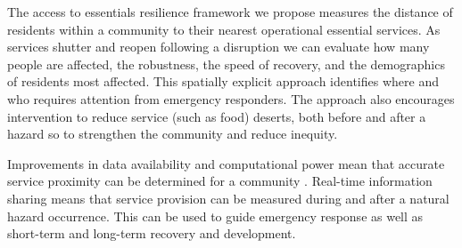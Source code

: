 \documentclass[9pt,twocolumn,twoside,lineno]{pnas-new}
\begin{document}
The access to essentials resilience framework we propose measures the distance of residents within a community to their nearest operational essential services. As services shutter and reopen following a disruption we can evaluate how many people are affected, the robustness, the speed of recovery, and the demographics of residents most affected. This spatially explicit approach identifies where and who requires attention from emergency responders. The approach also encourages intervention to reduce service (such as food) deserts, both before and after a hazard so to strengthen the community and reduce inequity.

Improvements in data availability and computational power mean that accurate service proximity can be determined for a community \cite{Logan2017-fr}. Real-time information sharing means that service provision can be measured during and after a natural hazard occurrence. This can be used to guide emergency response as well as short-term and long-term recovery and development. 
\end{document}
